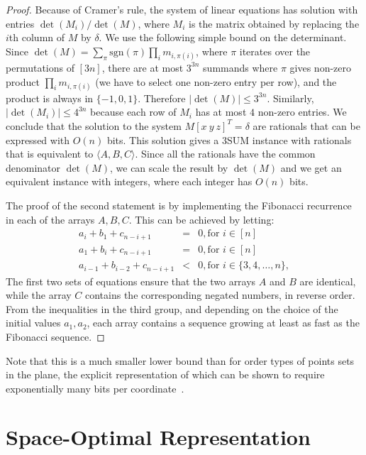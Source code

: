 \begin{proof}
Because of Cramer's rule, the system of linear equations has solution with entries
$\det(M_i)/\det(M)$,
where $M_i$ is the matrix obtained by replacing the $i$th column of $M$ by $\delta$.
We use the following simple bound on the determinant.
Since $\det(M)=\sum_{\pi}\mathrm{sgn}(\pi) \prod_i m_{i,\pi(i)}$, where
$\pi$ iterates over the permutations of $[3n]$, there are
at most $3^{3n}$ summands where $\pi$ gives non-zero product $\prod_i m_{i,\pi(i)}$ (we have
to select one non-zero entry per row), and the product is always in $\{ -1,0,1\}$.
Therefore $|\det(M)|\leq 3^{3n}$. Similarly, $|\det(M_i)|\leq 4^{3n}$ because
each row of $M_i$ has at most $4$ non-zero entries.
We conclude that the solution to the system $M [x~ y ~z]^T=\delta$
are rationals that can be expressed with $O(n)$ bits. This solution gives
a 3SUM instance with rationals that is equivalent to $\langle A, B, C \rangle$.
Since all the rationals have the common denominator $\det(M)$, we can scale the result
by $\det(M)$ and we get an equivalent instance with integers, where
each integer has $O(n)$ bits.

The proof of the second statement is by implementing the Fibonacci recurrence in each of the
arrays $A,B,C$. This can be achieved by letting:
\begin{eqnarray*}
  a_i + b_1 + c_{n-i+1} & = & 0, \text{for }i\in [n] \\
  a_1 + b_i + c_{n-i+1} & = & 0, \text{for }i\in [n] \\
  a_{i-1} + b_{i-2} + c_{n-i+1} & < & 0, \text{for }i\in \{3,4,\ldots,n\},
\end{eqnarray*}
The first two sets of equations ensure that the two arrays $A$ and $B$ are identical, while
the array $C$ contains the corresponding negated numbers, in reverse order.
From the inequalities in the third group, and depending on the choice of the initial values $a_1, a_2$,
each array contains a sequence growing at least as fast as the Fibonacci sequence.
\end{proof}

Note that this is a much smaller lower bound than for order types of points sets in the plane,
the explicit representation of which can be shown to require exponentially many bits per coordinate~\cite{GPS89}.

\section{Space-Optimal Representation}%
\label{s:space}

